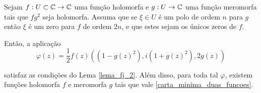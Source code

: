 \begin{teorema}
	Sejam $f: U \subset \mathbb{C} \rightarrow \mathbb{C}$ uma função holomorfa e $g: U \rightarrow \mathbb{C}$ uma função meromorfa tais que $fg^2$ seja holomorfa. Assuma que se $\xi \in U$ é um polo de ordem $n$ para $g$ então $\xi$ é um zero para $f$ de ordem $2n$, e que estes sejam os únicos zeros de $f$.
	
	Então, a aplicação
	\begin{equation}\label{carta_minima_duas_funcoes}
	\varphi(z) = \frac{1}{2} f(z) \left( (1-g(z)^2), i (1+g(z)^2), 2g(z) \right)
	\end{equation}
	
	satisfaz as condições do Lema \ref{lema_fj_2}. Além disso, para toda tal $\varphi$, existem funções holomorfa $f$ e meromorfa $g$ tais que vale \ref{carta_minima_duas_funcoes}.
\end{teorema}


